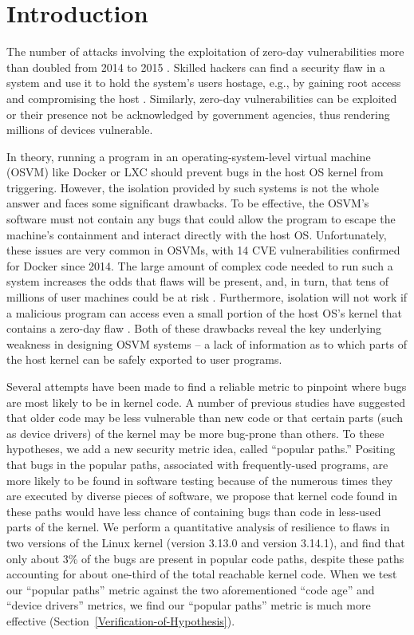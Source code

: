 \section{Introduction}
\label{sec.introduction}

The number of attacks involving the exploitation of zero-day vulnerabilities
more than doubled from 2014 to 2015 \cite{zero-day}. Skilled hackers can find a
 security flaw in a system and use it to hold the system's users hostage, e.g.,
by gaining root access and compromising the host \cite{linux-0day}. Similarly,
zero-day vulnerabilities can be exploited \cite{fbi-0day} or their presence not
be acknowledged \cite{nsa-0day} by government agencies, thus rendering millions
of devices vulnerable.

In theory, running a program in an operating-system-level virtual machine (OSVM)
like Docker \cite{Docker} or LXC \cite{LXC} should
prevent bugs in the host OS kernel from triggering.
However, the isolation provided by such systems is not the whole answer and
faces some significant drawbacks.
To be effective, the OSVM's software must not contain any bugs that could allow
the program to escape the machine's containment and interact directly with the host OS.
Unfortunately, these issues are very common in OSVMs, with 14 CVE vulnerabilities
confirmed for Docker \cite{Docker-Vulnerabilities} since 2014.
The large amount of complex code needed to run such a system increases the odds
that flaws will be present, and, in turn,
that tens of millions of user machines could be at risk \cite{linux-0day}.
Furthermore, isolation will not work if a malicious program can access even a small portion of the host OS's kernel
that contains a zero-day flaw \cite{CVE-2016-5195}.
Both of these drawbacks reveal the key underlying weakness in designing OSVM systems -- a lack of information
as to which parts of the host kernel can be safely exported to user programs.

Several attempts have been made to find a reliable metric to pinpoint where bugs
 are most likely to be in kernel code.
A number of previous studies have suggested that older code may be less vulnerable
 than new code \cite{ozment2006milk}
or that certain parts (such as device drivers) of the kernel \cite{PittSFIeld}
may be more bug-prone than others.
To these hypotheses, we add a new security metric idea, called ``popular paths.''
Positing that bugs in the popular paths, associated with frequently-used programs,
are more likely to be found in software testing
because of the numerous times they are executed by diverse pieces of software,
we propose that kernel code found in these paths 
would have less chance of containing bugs than code in less-used parts of the kernel.
We perform a quantitative analysis of resilience to flaws in two versions
of the Linux kernel (version 3.13.0 and version 3.14.1),
and find that only about 3\% of the bugs are present in popular code paths,
despite these paths accounting for about one-third of the total reachable kernel code.
When we test our ``popular paths'' metric against the two aforementioned
 ``code age'' and ``device drivers'' metrics,
we find our ``popular paths'' metric is much more effective
 (Section~{\ref{Verification-of-Hypothesis}}).

